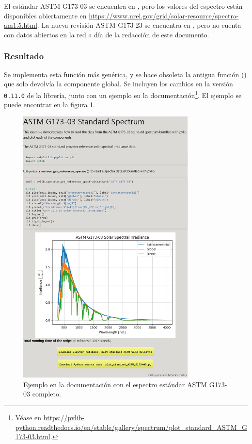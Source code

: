 El estándar ASTM G173-03 se encuentra en \cite{astm_g173-03}, pero los valores del espectro están disponibles abiertamente en \url{https://www.nrel.gov/grid/solar-resource/spectra-am1.5.html}.
La nueva revisión ASTM G173-23 se encuentra en \cite{astm_g173-23}, pero no cuenta con datos abiertos en la red a día de la redacción de este documento.

\subsubsection{Resultado}

Se implementa esta función más genérica, y se hace obsoleta la antigua función () que solo devolvía la componente global. Se incluyen los cambios en la versión \texttt{0.11.0} de la librería, junto con un ejemplo en la documentación\footnote{Véase en \url{https://pvlib-python.readthedocs.io/en/stable/gallery/spectrum/plot_standard_ASTM_G173-03.html}.}. El ejemplo se puede encontrar en la figura \ref{fig:espectro_astm_g173-03}.

\begin{figure}[H]
    \centering
    \includegraphics[width=0.8\textwidth]{./images/spectra/astm-g173-03.png}
    \caption{Ejemplo en la documentación con el espectro estándar ASTM G173-03 completo.}
    \label{fig:espectro_astm_g173-03}
\end{figure}

